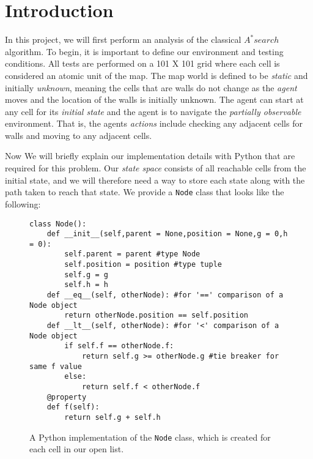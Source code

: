 \section{Introduction}
\label{sec:Introduction}

In this project, we will first perform an analysis of the classical $A^* search$  algorithm. To begin, it is important to define our environment and testing conditions. All tests are performed on a 101 X 101 grid where each cell is considered an atomic unit of the map. The map world is defined to be \emph{static} and initially \emph{unknown}, meaning the cells that are walls do not change as the \emph{agent} moves and the location of the walls is initially unknown. The agent can start at any cell for its \emph{initial state} and the agent is to navigate the \emph{partially observable} environment. That is, the agents \emph{actions} include checking any adjacent cells for walls and moving to any adjacent cells.


Now We will briefly explain our implementation details with Python that are required for this problem. Our \emph{state space} consists of all reachable cells from the initial state, and we will therefore need a way to store each state along with the path taken to reach that state. We provide a \texttt{Node} class that looks like the following:
\begin{figure}[h]
\begin{lstlisting}
class Node():
    def __init__(self,parent = None,position = None,g = 0,h = 0):
        self.parent = parent #type Node
        self.position = position #type tuple
        self.g = g
        self.h = h
    def __eq__(self, otherNode): #for '==' comparison of a Node object
        return otherNode.position == self.position
    def __lt__(self, otherNode): #for '<' comparison of a Node object
        if self.f == otherNode.f:
            return self.g >= otherNode.g #tie breaker for same f value
        else:
            return self.f < otherNode.f
    @property
    def f(self):
        return self.g + self.h
\end{lstlisting}
\caption{A Python implementation of the \texttt{Node} class, which is created for each cell in our open list.}
\end{figure}


